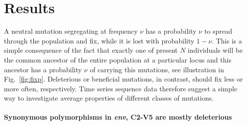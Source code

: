 \documentclass[rmp, twocolumn]{revtex4}
\newcommand{\mut}{\mu}
\newcommand{\env}{\textit{env}}
\newcommand{\FIG}[1]{Fig.~\ref{fig:#1}}
\begin{document}

\section{Results}

A neutral mutation segregating at frequency $\nu$ has a probability $\nu$ to
spread through the population and fix, while it is lost with probability
$1-\nu$. This is a simple consequence of the fact that exactly one of present
$N$ individuals will be the common ancestor of the entire population at a
particular locus and this ancestor has a probability $\nu$ of carrying this
mutations, see illustration in \FIG{fixp}. Deleterious or beneficial
mutations, in contrast, should fix less or more often, respectively. Time series
sequence data therefore suggest a simple way to investigate average properties
of different classes of mutations. 

\paragraph{Synonymous polymorphisms in \env, C2-V5 are mostly deleterious}
\end{document}
